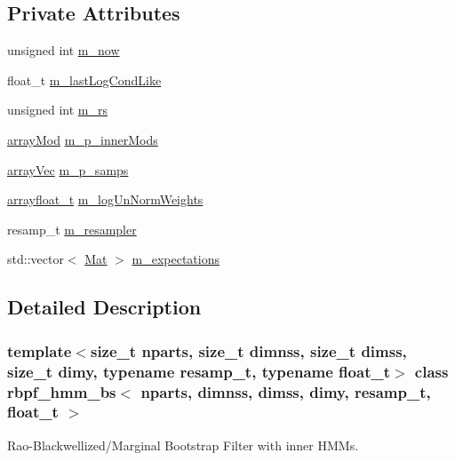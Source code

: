 \subsection*{Private Attributes}
\begin{DoxyCompactItemize}
\item 
unsigned int \hyperlink{classrbpf__hmm__bs_a9cc25241290c1a51a9b1c5c945ece110}{m\+\_\+now}
\item 
float\+\_\+t \hyperlink{classrbpf__hmm__bs_a90f0c7600229734cb3e5927685f63995}{m\+\_\+last\+Log\+Cond\+Like}
\item 
unsigned int \hyperlink{classrbpf__hmm__bs_a3c6154b8e0914dd042d6b08cfcb7d729}{m\+\_\+rs}
\item 
\hyperlink{classrbpf__hmm__bs_aa91b72fcbb93f89eade623504eaac11b}{array\+Mod} \hyperlink{classrbpf__hmm__bs_a3065666fdfb60baf45c52018acfade99}{m\+\_\+p\+\_\+inner\+Mods}
\item 
\hyperlink{classrbpf__hmm__bs_a073f5b7f5015d394259510b20f693a19}{array\+Vec} \hyperlink{classrbpf__hmm__bs_aa7b6a726eed547f0c30d12b499d5a251}{m\+\_\+p\+\_\+samps}
\item 
\hyperlink{classrbpf__hmm__bs_aa2dd927bb65838210f0d177b360606dc}{arrayfloat\+\_\+t} \hyperlink{classrbpf__hmm__bs_a9a0c878d809b4e8b4c0f496a0eb750d1}{m\+\_\+log\+Un\+Norm\+Weights}
\item 
resamp\+\_\+t \hyperlink{classrbpf__hmm__bs_ad7b27f32a6ff8e79ff0ffd7cf6f14434}{m\+\_\+resampler}
\item 
std\+::vector$<$ \hyperlink{classrbpf__hmm__bs_aa0bd79c7ece59908ed08c51da3d67dad}{Mat} $>$ \hyperlink{classrbpf__hmm__bs_a1b92aad4ad9990aa7876a06999d1ea71}{m\+\_\+expectations}
\end{DoxyCompactItemize}


\subsection{Detailed Description}
\subsubsection*{template$<$size\+\_\+t nparts, size\+\_\+t dimnss, size\+\_\+t dimss, size\+\_\+t dimy, typename resamp\+\_\+t, typename float\+\_\+t$>$\newline
class rbpf\+\_\+hmm\+\_\+bs$<$ nparts, dimnss, dimss, dimy, resamp\+\_\+t, float\+\_\+t $>$}

Rao-\/\+Blackwellized/\+Marginal Bootstrap Filter with inner H\+M\+Ms. 

